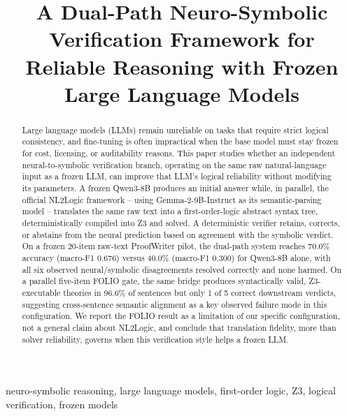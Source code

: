 \documentclass[conference]{IEEEtran}
\begin{document}

\title{A Dual-Path Neuro-Symbolic Verification Framework for Reliable Reasoning with Frozen Large Language Models}

\author{
}

\maketitle

\begin{abstract}
Large language models (LLMs) remain unreliable on tasks that require strict logical consistency, and fine-tuning is often impractical when the base model must stay frozen for cost, licensing, or auditability reasons. This paper studies whether an independent neural-to-symbolic verification branch, operating on the same raw natural-language input as a frozen LLM, can improve that LLM's logical reliability without modifying its parameters. A frozen Qwen3-8B produces an initial answer while, in parallel, the official NL2Logic framework -- using Gemma-2-9B-Instruct as its semantic-parsing model -- translates the same raw text into a first-order-logic abstract syntax tree, deterministically compiled into Z3 and solved. A deterministic verifier retains, corrects, or abstains from the neural prediction based on agreement with the symbolic verdict. On a frozen 20-item raw-text ProofWriter pilot, the dual-path system reaches 70.0\% accuracy (macro-F1 0.676) versus 40.0\% (macro-F1 0.300) for Qwen3-8B alone, with all six observed neural/symbolic disagreements resolved correctly and none harmed. On a parallel five-item FOLIO gate, the same bridge produces syntactically valid, Z3-executable theories in 96.6\% of sentences but only 1 of 5 correct downstream verdicts, suggesting cross-sentence semantic alignment as a key observed failure mode in this configuration. We report the FOLIO result as a limitation of our specific configuration, not a general claim about NL2Logic, and conclude that translation fidelity, more than solver reliability, governs when this verification style helps a frozen LLM.
\end{abstract}

\begin{IEEEkeywords}
neuro-symbolic reasoning, large language models, first-order logic, Z3, logical verification, frozen models
\end{IEEEkeywords}
\end{document}
